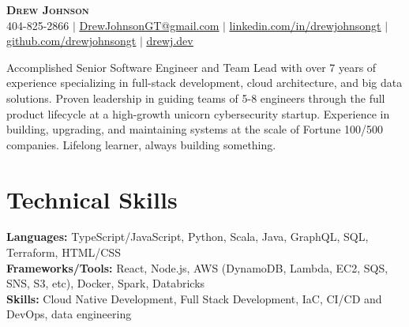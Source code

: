 \documentclass[letterpaper,11pt]{article}
\newcommand{\overviewSection}[1]{%
  \begin{center}
    \small #1 \par
  \end{center}
}
\begin{document}

\begin{center}
	\textbf{\Huge \scshape Drew Johnson} \\ \vspace{1pt}
	\small 404-825-2866 $|$ \href{mailto:x@x.com}{\underline{DrewJohnsonGT@gmail.com}} $|$ 
	\href{https://linkedin.com/in/drewjohnsongt}{\underline{linkedin.com/in/drewjohnsongt}} $|$
	\href{https://github.com/drewjohnsongt}{\underline{github.com/drewjohnsongt}} $|$
	\href{https://drewj.dev/}{\underline{drewj.dev}}
\end{center}


\overviewSection {Accomplished Senior Software Engineer and Team Lead with over 7 years of experience specializing in full-stack development, cloud architecture, and big data solutions. Proven leadership in guiding teams of 5-8 engineers through the full product lifecycle at a high-growth unicorn cybersecurity startup. Experience in building, upgrading, and maintaining systems at the scale of Fortune 100/500 companies. Lifelong learner, always building something.}

\section{Technical Skills}
\begin{itemize}[leftmargin=0.15in, label={}]
	\small{\item{
		\textbf{Languages:}{ TypeScript/JavaScript, Python, Scala, Java, GraphQL, SQL, Terraform, HTML/CSS} \\
		\textbf{Frameworks/Tools:}{ React, Node.js, AWS (DynamoDB, Lambda, EC2, SQS, SNS, S3, etc), Docker, Spark, Databricks} \\
		\textbf{Skills:}{ Cloud Native Development, Full Stack Development, IaC, CI/CD and DevOps, data engineering}
        }}
\end{itemize}
 
\end{document}
